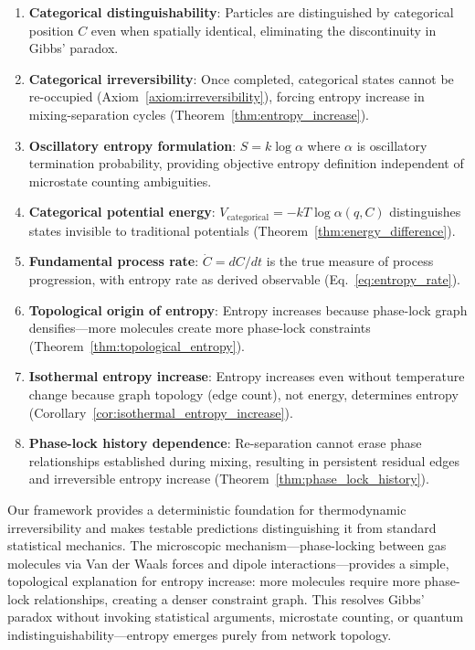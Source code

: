 \documentclass[12pt,a4paper]{article}
\theoremstyle{remark}
\begin{document}
\begin{enumerate}
\item \textbf{Categorical distinguishability}: Particles are distinguished by categorical position $C$ even when spatially identical, eliminating the discontinuity in Gibbs' paradox.

\item \textbf{Categorical irreversibility}: Once completed, categorical states cannot be re-occupied (Axiom~\ref{axiom:irreversibility}), forcing entropy increase in mixing-separation cycles (Theorem~\ref{thm:entropy_increase}).

\item \textbf{Oscillatory entropy formulation}: $S = k \log \alpha$ where $\alpha$ is oscillatory termination probability, providing objective entropy definition independent of microstate counting ambiguities.

\item \textbf{Categorical potential energy}: $V_\text{categorical} = -kT \log \alpha(q, C)$ distinguishes states invisible to traditional potentials (Theorem~\ref{thm:energy_difference}).

\item \textbf{Fundamental process rate}: $\dot{C} = dC/dt$ is the true measure of process progression, with entropy rate as derived observable (Eq.~\eqref{eq:entropy_rate}).

\item \textbf{Topological origin of entropy}: Entropy increases because phase-lock graph densifies—more molecules create more phase-lock constraints (Theorem~\ref{thm:topological_entropy}).

\item \textbf{Isothermal entropy increase}: Entropy increases even without temperature change because graph topology (edge count), not energy, determines entropy (Corollary~\ref{cor:isothermal_entropy_increase}).

\item \textbf{Phase-lock history dependence}: Re-separation cannot erase phase relationships established during mixing, resulting in persistent residual edges and irreversible entropy increase (Theorem~\ref{thm:phase_lock_history}).
\end{enumerate}

Our framework provides a deterministic foundation for thermodynamic irreversibility and makes testable predictions distinguishing it from standard statistical mechanics. The microscopic mechanism—phase-locking between gas molecules via Van der Waals forces and dipole interactions—provides a simple, topological explanation for entropy increase: more molecules require more phase-lock relationships, creating a denser constraint graph. This resolves Gibbs' paradox without invoking statistical arguments, microstate counting, or quantum indistinguishability—entropy emerges purely from network topology.
\end{document}

